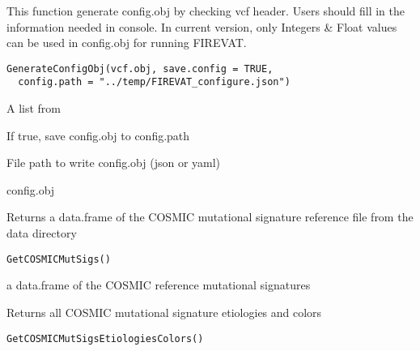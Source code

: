 \documentclass[letterpaper]{book}
\begin{document}
%
\begin{Description}\relax
This function generate config.obj by checking vcf header.
Users should fill in the information needed in console.
In current version, only Integers \& Float values can be used in
config.obj for running FIREVAT.
\end{Description}
%
\begin{Usage}
\begin{verbatim}
GenerateConfigObj(vcf.obj, save.config = TRUE,
  config.path = "../temp/FIREVAT_configure.json")
\end{verbatim}
\end{Usage}
%
\begin{Arguments}
\begin{ldescription}
\item[\code{vcf.obj}] A list from 

\item[\code{save.config}] If true, save config.obj to config.path

\item[\code{config.path}] File path to write config.obj (json or yaml)
\end{ldescription}
\end{Arguments}
%
\begin{Value}
config.obj
\end{Value}
%
\begin{Description}\relax
Returns a data.frame of the COSMIC mutational signature reference file
from the data directory
\end{Description}
%
\begin{Usage}
\begin{verbatim}
GetCOSMICMutSigs()
\end{verbatim}
\end{Usage}
%
\begin{Value}
a data.frame of the COSMIC reference mutational signatures
\end{Value}
%
\begin{Description}\relax
Returns all COSMIC mutational signature etiologies and colors
\end{Description}
%
\begin{Usage}
\begin{verbatim}
GetCOSMICMutSigsEtiologiesColors()
\end{verbatim}
\end{Usage}
\end{document}
